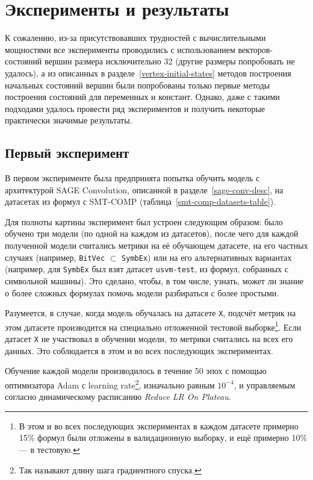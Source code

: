 \newpage

\section{Эксперименты и результаты}


К сожалению, из-за присутствовавших трудностей с вычислительными мощностями все эксперименты проводились с использованием векторов-состояний вершин размера исключительно 32 (другие размеры попробовать не удалось), а из описанных в разделе~\ref{vertex-initial-states} методов построения начальных состояний вершин были попробованы только первые методы построения состояний для переменных и констант. Однако, даже с такими подходами удалось провести ряд экспериментов и получить некоторые практически значимые результаты.

\subsection{Первый эксперимент}

В первом эксперименте была предпринята попытка обучить модель с архитектурой SAGE Convolution, описанной в разделе~\ref{sage-conv-desc}, на датасетах из формул с SMT-COMP (таблица~\ref{smt-comp-datasets-table}).

Для полноты картины эксперимент был устроен следующим образом: было обучено три модели (по одной на каждом из датасетов), после чего для каждой полученной модели считались метрики на её обучающем датасете, на его частных случаях (например, \texttt{BitVec} $\subset$ \texttt{SymbEx}) или на его альтернативных вариантах (например, для \texttt{SymbEx} был взят датасет \texttt{usvm-test}, из формул, собранных с символьной машины). Это сделано, чтобы, в том числе, узнать, может ли знание о более сложных формулах помочь модели разбираться с более простыми.

Разумеется, в случае, когда модель обучалась на датасете \texttt{X}, подсчёт метрик на этом датасете производится на специально отложенной тестовой выборке\footnote{В этом и во всех последующих экспериментах в каждом датасете примерно 15\% формул были отложены в валидационную выборку, и ещё примерно 10\% --- в тестовую.}. Если датасет \texttt{X} не участвовал в обучении модели, то метрики считались на всех его данных. Это соблюдается в этом и во всех последующих экспериментах.

Обучение каждой модели производилось в течение 50 эпох с помощью оптимизатора Adam \cite{adam-paper} с learning rate\footnote{Так называют длину шага градиентного спуска.}, изначально равным $10^{-4}$, и управляемым согласно динамическому расписанию \textit{Reduce LR On Plateau}.

